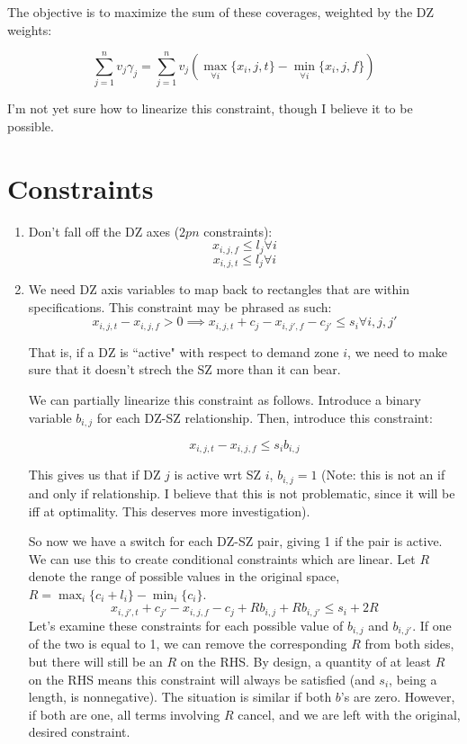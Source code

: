 \documentclass[a4paper]{article}
\begin{document}
The objective is to maximize the sum of these coverages, weighted by the DZ weights:

$$
\sum_{j=1}^n v_j \gamma_j = \sum_{j=1}^n v_j(\max_{\forall i}\{x_i,j,t\} - \min_{\forall i}\{x_i,j,f\})
$$

I'm not yet sure how to linearize this constraint, though I believe it to be possible.

\section{Constraints}

\begin{enumerate}
    \item Don't fall off the DZ axes ($2pn$ constraints):
        $$x_{i,j,f} \leq l_j \forall i$$
        $$x_{i,j,t} \leq l_j \forall i$$
    \item We need DZ axis variables to map back to rectangles that are within specifications. This constraint may be phrased as such:
        $$
        x_{i,j,t} - x_{i,j,f} > 0 \implies x_{i,j,t} + c_{j} - x_{i,j',f} - c_{j'} \leq s_i \forall i,j,j'
        $$

        That is, if a DZ is ``active"  with respect to demand zone $i$, we need to make sure that it doesn't strech the SZ more than it can bear. 

        We can partially linearize this constraint as follows. Introduce a binary variable $b_{i,j}$ for each DZ-SZ relationship. Then, introduce this constraint:
        
        $$
        x_{i,j,t} - x_{i,j,f} \leq s_i b_{i,j}
        $$

        This gives us that if DZ $j$ is active wrt SZ $i$, $b_{i,j} = 1$ (Note: this is not an if and only if relationship. I believe that this is not problematic, since it will be iff at optimality. This deserves more investigation). 

        So now we have a switch for each DZ-SZ pair, giving 1 if the pair is active. We can use this to create conditional constraints which are linear. Let $R$ denote the range of possible values in the original space, $R = \max_{i}\{c_i + l_i\} - \min_{i}\{c_i\}$.
        $$
        x_{i,j',t} + c_{j'} - x_{i,j,f} - c_j + Rb_{i,j} + Rb_{i,j'} \leq s_i + 2R
        $$
        Let's examine these constraints for each possible value of $b_{i,j}$ and $b_{i,j'}$. If one of the two is equal to 1, we can remove the corresponding $R$ from both sides, but there will still be an $R$ on the RHS. By design, a quantity of at least $R$ on the RHS means this constraint will always be satisfied (and $s_i$, being a length, is nonnegative). The situation is similar if both $b$'s are zero. However, if both are one, all terms involving $R$ cancel, and we are left with the original, desired constraint. 


\end{enumerate}
\end{document}
